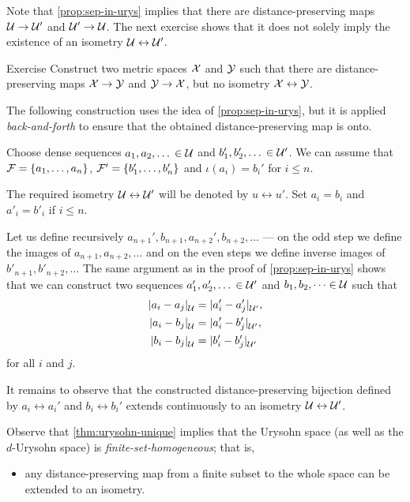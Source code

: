 Note that \ref{prop:sep-in-urys} implies that there are distance-preserving maps $\spc{U}\z\to \spc{U}'$ and $\mathcal{U}'\to \mathcal{U}$.
The next exercise shows that it does not solely imply the existence of an isometry $\mathcal{U}\leftrightarrow \mathcal{U}'$.

\begin{thm}{Exercise}\label{ex:no-isom}
Construct two metric spaces $\mathcal{X}$ and $\mathcal{Y}$ such that 
there are distance-preserving maps $\mathcal{X}\to \mathcal{Y}$ and $\mathcal{Y}\to \mathcal{X}$, but no isometry $\mathcal{X}\leftrightarrow \mathcal{Y}$.
\end{thm}


The following construction uses the idea of \ref{prop:sep-in-urys}, but it is applied \emph{back-and-forth} to ensure that the obtained distance-preserving map is onto.

Choose dense sequences $a_1,a_2,\dots{}\in \mathcal{U}$ and $b'_1,b'_2,\dots{}\in \mathcal{U}'$.
We can assume that $\mathcal{F}=\{a_1,\dots,a_n\}$, $\mathcal{F}'=\{b_1',\dots,b_n'\}$ and $\iota(a_i)=b_i'$ for $i\le n$.

The required isometry $\mathcal{U}\leftrightarrow \mathcal{U}'$ will be denoted by $u \leftrightarrow u'$.
Set $a_i=b_i$ and $a'_i=b'_i$ if $i\le n$.

Let us define recursively $a_{n+1}',b_{n+1}, a_{n+2}', b_{n+2},\dots$ --- on the odd step we define the images of $a_{n+1},a_{n+2},\dots$ and on the even steps we define inverse images of $b'_{n+1},b'_{n+2},\dots$
The same argument as in the proof of \ref{prop:sep-in-urys} shows that we can construct two sequences $a_1',a_2',\dots{}\in \mathcal{U}'$ and $b_1,b_2,\dots\in \mathcal{U}$ such that
\begin{align*}
\dist{a_i}{a_j}{\spc{U}}&=\dist{a_i'}{a_j'}{\spc{U}'},
\\
\dist{a_i}{b_j}{\spc{U}}&=\dist{a_i'}{b_j'}{\spc{U}'},
\\
\dist{b_i}{b_j}{\spc{U}}&=\dist{b_i'}{b_j'}{\spc{U}'}
\end{align*}
for all $i$ and $j$.

It remains to observe that the constructed distance-preserving bijection defined by $a_i\leftrightarrow a_i'$ and $b_i\leftrightarrow b_i'$ extends
continuously to an isometry $\mathcal{U}\leftrightarrow \mathcal{U}'$. 
\qeds

Observe that \ref{thm:urysohn-unique} implies that the Urysohn space (as well as the $d$-Urysohn space) is \emph{finite-set-homogeneous}; that is,
\begin{itemize}
 \item any distance-preserving map from a finite subset to the whole space can be extended to an isometry.
\end{itemize}

